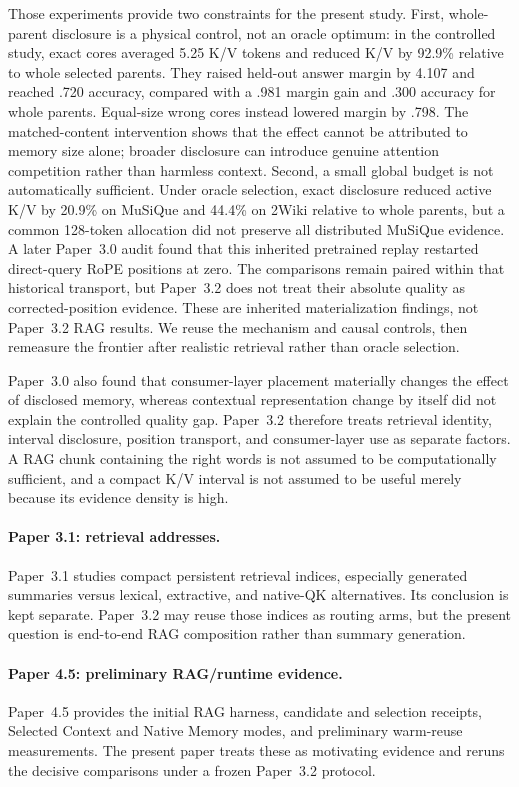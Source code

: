 \documentclass[11pt]{article}
\begin{document}
Those experiments provide two constraints for the present study. First,
whole-parent disclosure is a physical control, not an oracle optimum: in the
controlled study, exact cores averaged 5.25 K/V tokens and reduced K/V by
92.9\% relative to whole selected parents. They raised held-out answer margin
by 4.107 and reached .720 accuracy, compared with a .981 margin gain and .300
accuracy for whole parents. Equal-size wrong cores instead lowered margin by
.798. The matched-content intervention shows that the effect cannot be
attributed to memory size alone; broader disclosure can introduce genuine
attention competition rather than harmless context. Second, a small global budget is not
automatically sufficient. Under oracle selection, exact disclosure reduced
active K/V by 20.9\% on MuSiQue and 44.4\% on 2Wiki relative to whole parents,
but a common 128-token allocation did not preserve all distributed MuSiQue
evidence. A later Paper~3.0 audit found that this inherited pretrained replay
restarted direct-query RoPE positions at zero. The comparisons remain paired
within that historical transport, but Paper~3.2 does not treat their absolute
quality as corrected-position evidence. These are inherited materialization
findings, not Paper~3.2 RAG results. We reuse the mechanism and causal controls,
then remeasure the frontier after realistic retrieval rather than oracle
selection.

Paper~3.0 also found that consumer-layer placement materially changes the
effect of disclosed memory, whereas contextual representation change by itself
did not explain the controlled quality gap. Paper~3.2 therefore treats
retrieval identity, interval disclosure, position transport, and consumer-layer
use as separate factors. A RAG chunk containing the right words is not assumed
to be computationally sufficient, and a compact K/V interval is not assumed to
be useful merely because its evidence density is high.

\paragraph{Paper 3.1: retrieval addresses.}
Paper~3.1 studies compact persistent retrieval indices, especially generated summaries versus lexical, extractive, and native-QK alternatives.  Its conclusion is kept separate.  Paper~3.2 may reuse those indices as routing arms, but the present question is end-to-end RAG composition rather than summary generation.

\paragraph{Paper 4.5: preliminary RAG/runtime evidence.}
Paper~4.5 provides the initial RAG harness, candidate and selection receipts, Selected Context and Native Memory modes, and preliminary warm-reuse measurements.  The present paper treats these as motivating evidence and reruns the decisive comparisons under a frozen Paper~3.2 protocol.
\end{document}
